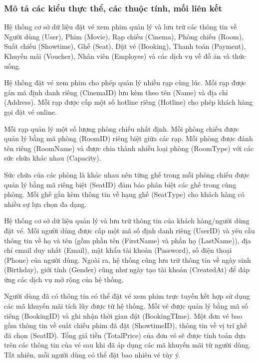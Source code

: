 \documentclass[a4paper]{article}
\newcommand{\cach}{\hspace*{1.5em}\ignorespaces}
\begin{document}
\subsubsection{Mô tả các kiểu thực thể, các thuộc tính, mối liên kết}
\cach Hệ thống cơ sở dữ liệu đặt vé xem phim quản lý và lưu trữ các thông tin về Người dùng (User), Phim (Movie), Rạp chiếu (Cinema), Phòng chiếu (Room), Suất chiếu (Showtime), Ghế (Seat), Đặt vé (Booking), Thanh toán (Payment), Khuyến mãi (Voucher), Nhân viên (Employee) và các dịch vụ về đồ ăn và thức uống.

Hệ thống đặt vé xem phim cho phép quản lý nhiều rạp cùng lúc. 
Mỗi rạp được gán mã định danh riêng (CinemaID) lưu kèm theo tên (Name) và địa chỉ (Address). 
Mỗi rạp được cấp một số hotline riêng (Hotline) cho phép khách hàng gọi đặt vé online. 

Mỗi rạp quản lý một số lượng phòng chiếu nhất định. 
Mỗi phòng chiếu được quản lý bằng mã phòng (RoomID) riêng biệt giữa các rạp. 
Mỗi phòng được đánh tên riêng (RoomName) và được chia thành nhiều loại phòng (RoomType) với các sức chứa khác nhau (Capacity).

Sức chứa của các phòng là khác nhau nên từng ghế trong mỗi phòng chiếu được quản lý bằng mã riêng biệt (SeatID) đảm bảo phân biệt các ghế trong cùng phòng. 
Mỗi ghế gắn kèm thông tin về hạng ghế (SeatType) cho khách hàng có nhiều sự lựa chọn đa dạng.

Hệ thống cơ sở dữ liệu quản lý và lưu trữ thông tin của khách hàng/người dùng đặt vé. 
Mỗi người dùng được cấp một mã số định danh riêng (UserID) và yêu cầu thông tin về họ và tên (gồm phần tên (FirstName) và phần họ (LastName)), địa chỉ email duy nhất (Email), mật khẩu tài khoản (Password), số điện thoại (Phone) của người dùng. 
Ngoài ra, hệ thống cũng lưu trữ thông tin về ngày sinh (Birthday), giới tính (Gender) cũng như ngày tạo tài khoản (CreatedAt) để đáp ứng các dịch vụ mở rộng của hệ thống.


Người dùng đã có thông tin có thể đặt vé xem phim trực tuyến kết hợp sử dụng các mã khuyến mãi tích lũy được từ hệ thống.
Mỗi vé được quản lý bằng mã số riêng (BookingID) và ghi nhận thời gian đặt (BookingTIme). Một đơn vé bao gồm thông tin về suất chiếu phim đã đặt (ShowtimeID), thông tin về vị trí ghế đã chọn (SeatID). 
Tổng giá tiền (TotalPrice) của đơn vé sẽ được tính toán dựa trên các thông tin của vé sau khi đã áp dụng các mã khuyến mãi từ người dùng. 
Tất nhiên, mỗi người dùng có thể đặt bao nhiêu vé tùy ý.
\end{document}

